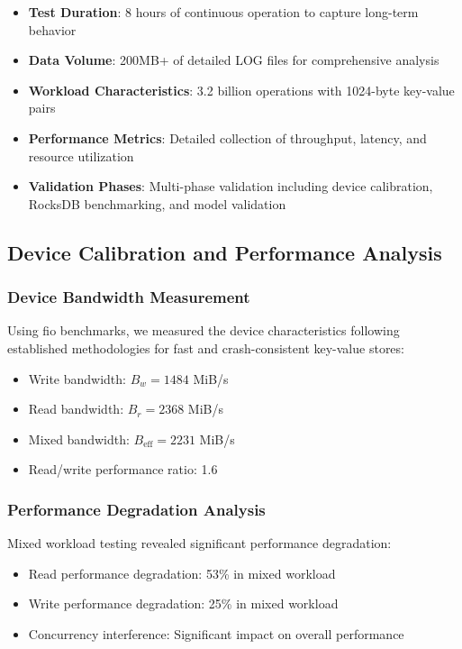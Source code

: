 \documentclass[11pt]{article}
\begin{document}
\begin{itemize}
    \item \textbf{Test Duration}: 8 hours of continuous operation to capture long-term behavior
    \item \textbf{Data Volume}: 200MB+ of detailed LOG files for comprehensive analysis
    \item \textbf{Workload Characteristics}: 3.2 billion operations with 1024-byte key-value pairs
    \item \textbf{Performance Metrics}: Detailed collection of throughput, latency, and resource utilization
    \item \textbf{Validation Phases}: Multi-phase validation including device calibration, RocksDB benchmarking, and model validation
\end{itemize}

\subsection{Device Calibration and Performance Analysis}

\subsubsection{Device Bandwidth Measurement}
Using fio benchmarks, we measured the device characteristics following established methodologies for fast and crash-consistent key-value stores:
\begin{itemize}
    \item Write bandwidth: $B_w = 1484$ MiB/s
    \item Read bandwidth: $B_r = 2368$ MiB/s
    \item Mixed bandwidth: $B_{\text{eff}} = 2231$ MiB/s
    \item Read/write performance ratio: 1.6
\end{itemize}

\subsubsection{Performance Degradation Analysis}
Mixed workload testing revealed significant performance degradation:
\begin{itemize}
    \item Read performance degradation: 53\% in mixed workload
    \item Write performance degradation: 25\% in mixed workload
    \item Concurrency interference: Significant impact on overall performance
\end{itemize}
\end{document}

